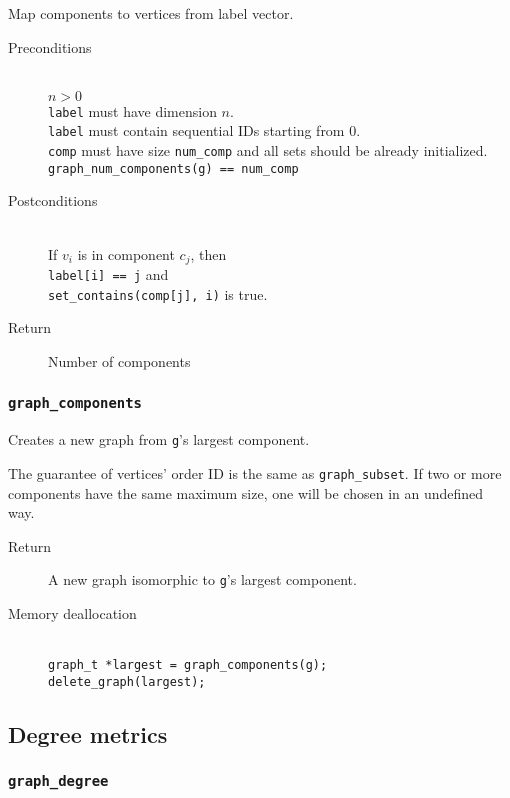 Map components to vertices from label vector.

\begin{description}
 \item[Preconditions] ~\\
   $n > 0$ \\
   \texttt{label} must have dimension $n$. \\
   \texttt{label} must contain sequential IDs starting from 0. \\
   \texttt{comp} must have size \texttt{num\_comp} and all sets should be already
   initialized. \\
   \texttt{graph\_num\_components(g) == num\_comp}
 \item[Postconditions] ~\\
   If $v_i$ is in component $c_j$, then \\
    \quad\texttt{label[i] == j} and \\
    \quad\texttt{set\_contains(comp[j], i)} is true.
 \item[Return] Number of components
\end{description}

\subsubsection{\texttt{graph\_components}}

Creates a new graph from \texttt{g}'s largest component.

The guarantee of vertices' order ID is the same as \texttt{graph\_subset}.
If two or more components have the same maximum size, one will be chosen in
an undefined way.

\begin{description}
 \item[Return] A new graph isomorphic to \texttt{g}'s largest component.
 \item[Memory deallocation] ~\\
   \texttt{graph\_t *largest = graph\_components(g);} \\
   \texttt{delete\_graph(largest);}
\end{description}

\subsection{Degree metrics}
\subsubsection{\texttt{graph\_degree}}

